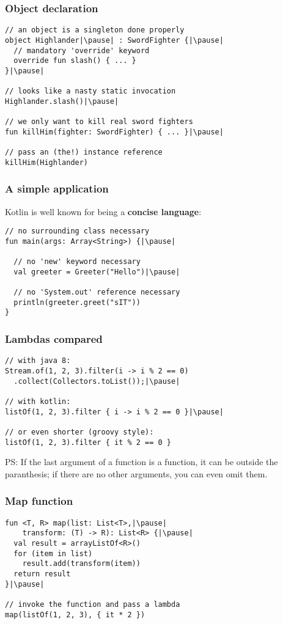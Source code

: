 \begin{frame}[fragile] \frametitle{Object declaration}
\pause
\begin{lstlisting}
// an object is a singleton done properly
object Highlander|\pause| : SwordFighter {|\pause|
  // mandatory 'override' keyword
  override fun slash() { ... }
}|\pause|

// looks like a nasty static invocation
Highlander.slash()|\pause|

// we only want to kill real sword fighters
fun killHim(fighter: SwordFighter) { ... }|\pause|

// pass an (the!) instance reference
killHim(Highlander)
\end{lstlisting}
\end{frame}


\begin{frame}[fragile] \frametitle{A simple application}
Kotlin is well known for being a \textbf{concise language}:\pause
\begin{lstlisting}
// no surrounding class necessary
fun main(args: Array<String>) {|\pause|

  // no 'new' keyword necessary
  val greeter = Greeter("Hello")|\pause|

  // no 'System.out' reference necessary
  println(greeter.greet("sIT"))
}
\end{lstlisting}
\end{frame}

\begin{frame}[fragile] \frametitle{Lambdas compared}
\pause
\begin{lstlisting}
// with java 8:
Stream.of(1, 2, 3).filter(i -> i % 2 == 0)
  .collect(Collectors.toList());|\pause|

// with kotlin:
listOf(1, 2, 3).filter { i -> i % 2 == 0 }|\pause|

// or even shorter (groovy style):
listOf(1, 2, 3).filter { it % 2 == 0 }
\end{lstlisting}
\pause
\small{PS: If the last argument of a function is a function, it can be outside the paranthesis; if there are no other arguments, you can even omit them.}
\end{frame}

\begin{frame}[fragile] \frametitle{Map function}
\pause
\begin{lstlisting}
fun <T, R> map(list: List<T>,|\pause|
    transform: (T) -> R): List<R> {|\pause|
  val result = arrayListOf<R>()
  for (item in list)
    result.add(transform(item))
  return result
}|\pause|

// invoke the function and pass a lambda
map(listOf(1, 2, 3), { it * 2 })
\end{lstlisting}
\end{frame}

